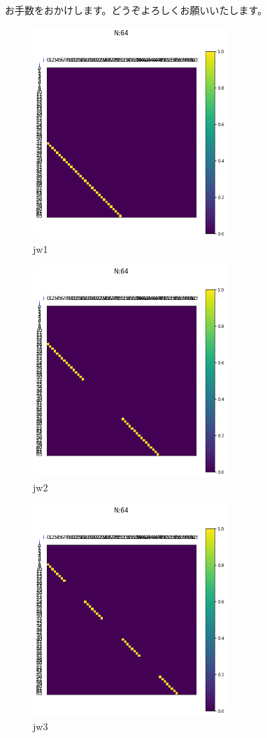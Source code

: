 \documentclass[a4paper, 10pt, dvipdfmx]{jlreq}
\begin{document}
お手数をおかけします。どうぞよろしくお願いいたします。

\begin{figure}[htbp]
    \begin{center}
        \includegraphics[height=80mm]{jw_operators/1.png}
        \caption{jw1}
    \end{center}
\end{figure}
\begin{figure}[htbp]
    \begin{center}
        \includegraphics[height=80mm]{jw_operators/2.png}
        \caption{jw2}
    \end{center}
\end{figure}
\begin{figure}[htbp]
    \begin{center}
        \includegraphics[height=80mm]{jw_operators/3.png}
        \caption{jw3}
    \end{center}
\end{figure}
\end{document}
